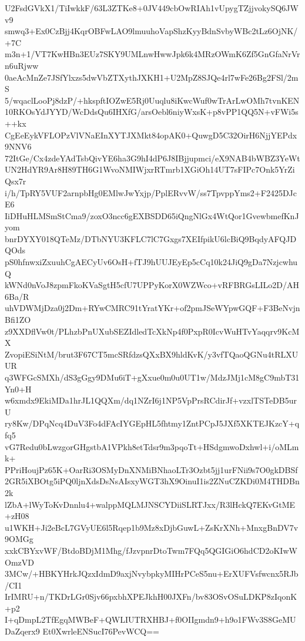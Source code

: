 U2FsdGVkX1/TiIwkkF/63L3ZTKe8+0JV449cbOwRIAh1vUpygTZjjvokySQ6JWv9
smwq3+Ex0CzBjj4KqrOBFwLAO9lmuuhoVapShzKyyBdnSvbyWBc2tLz6OjNK/+7C
m3n+1/VT7KwHBn3EUz7SKY9UMLnwHwwJpk6k4MRzOWmK6Zf5GnGfaNrVrn6uRjww
0aeAcMnZe7JSfYlxzs5dwVbZTXythJXKH1+U2MpZ8SJQe4rl7wFe26Bg2FSl/2mS
5/wqaclLooPj8dzP/+hkspftIOZwE5Rj0Uuqlu8iKwcWuf0wTrArLwOMh7tvnKEN
10RKOsYdJYYD/WcDdsQu6IHXfG/arsOebl6niyWxsK+p8vPP1QQ5N+vFWi5s++kx
CgEeEykVFLOPzVlVNaEInXYTJXMkt84opAK0+QuwgD5C32OirH6NjjYEPdx9NNV6
72ItGe/Cx4zdeYAdTsbQivYE6ha3G9hI4dP6J8IBjjupmci/eX9NAB4bWBZ3YeWt
UN2HdYR9Ar8H89TH6G1WvoNMIWjxrRTmrb1XGiOh14UT7sFIPc7Onk5YrZiQsx7r
i/h/TpRY5VUF2arnpbHg0EMlwJwYxjp/PplERvvW/ss7TpvppYms2+F2425DJcE6
IiDHuHLMSmStCma9/zoxO3ncc6gEXBSDD65iQngNlGx4WtQor1GvewbmefKnJyom
bnrDYXY018QTeMz/DTbNYU3KFLC7lC7Gxgs7XEIfpikU6lcBiQ9BqdyAFQJDQOds
pS0hfnwxiZxuuhCgAECyUv6OsH+fTJ9hUUJEyEp5cCq10k24JiQ9gDa7NzjcwhuQ
kWNd0nVoJ8zpmFkoKVaSgtH5cfU7UPPyKorX0WZWco+vRFBRGsLILo2D/AH6Ba/R
uhVDWMjDza0j2Dm+RYwCMRC91tYratYKr+of2pmJSeWYpwGQF+F3BeNvjnBfi1ZO
z9XXDflVw0t/PLhzbPnUXubSEZIdledTcXkNp4f0PxpR0IcvWuHTvYaqqrv9KcMX
ZvopiESiNtM/brut3F67CT5mcSRfdzsQXxBX9hldKvK/y3vfTQaoQGNu4tRLXUUR
q3WFGcSMXh/dS3gGgy9DMu6iT+gXxue0m0u0UT1w/MdzJMj1cM8gC9mbT31Yn0+H
w6xmdx9EkiMDa1hrJL1QQXm/dq1NZrI6j1NP5VpPrsRCdirJf+vzxlTSTeDB5urU
ry8Kw/DPqNcq4DuV3Fo4dFAcIYGEpHL5fhtmy1ZntPCpJ5JXf5XKTEJKzcY+qfq5
vG7Redu0bLwzgorGHgstbA1VPkh8etTdsr9m3pqoTt+HSdgmwoDxhwl+i/oMLmk+
PPriHoujPz65K+OarRi3OSMyDnXNMiBNhaoLTr3Ozbt5jj1urFNii9s7O0gkDBSf
2GR5iXBOtg5iPQ0ljnXdsDsNsAIsxyWGT3hX9OinuI1is2ZNuCZKDi0M4THDBn2k
lZbA+lWyToKvDnnlu4+walppMQLMJNSCYDiiSLRTJxx/R3lHckQ7EKvGtME+zH08
u1WKH+Ji2eBcL7GVyUE6l5Rqep1b9Mz8xDjbGuwL+ZsKrXNh+MnxgBnDV7v9OMGg
xxkCBYxvWF/BtdoBDjM1Mhg/fJzvpnrDtoTwm7FQq5QGIGiO6hdCD2oKIwWOmzVD
3MCw/+HBKYHrkJQzxIdmD9axjNvybpkyMIHrPCeS5nu+ErXUFVsfwcnx5RJb/CI1
IrIMRU+n/TKDrLGr0Sjv66pxbhXPEJkhH00JXFn/bv83OSvOSuLDKP8zIqonK+p2
I+qDmpL2TfEgqMWBeF+QWLIUTRXHBJ+f0OIIgmdn9+h9o1FWv3S8GeMUDaZqerx9
Et0XwrleENSucI76PevWCQ==
